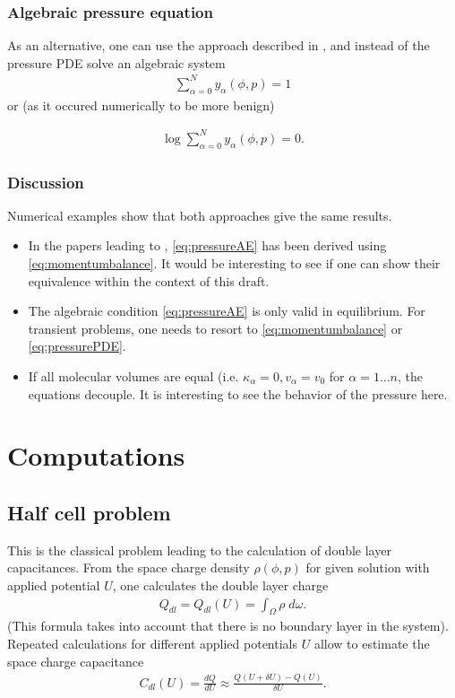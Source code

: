 \documentclass[12pt,oneside,reqno]{amsart}
\begin{document}
\subsubsection{Algebraic pressure equation}
As an alternative, one can use the approach described in \cite{MuellerFuhrmannLandstorfer2020},
and instead of the pressure PDE solve an algebraic system
\begin{align}
  \label{eq:pressureAE}
  \sum_{\alpha=0}^N y_\alpha(\phi,p)=1
\end{align}
or (as it occured numerically to be more benign)

\begin{align}
  \label{eq:pressureAElog}
  \log \sum_{\alpha=0}^N y_\alpha(\phi,p)=0.
\end{align}

\subsubsection{Discussion}
Numerical examples show that both approaches give the same results.
\begin{itemize}
  \item  In the papers leading to \cite{MuellerFuhrmannLandstorfer2020}, \eqref{eq:pressureAE} has
        been derived using \eqref{eq:momentumbalance}. It would be interesting to see if
        one can show their equivalence within the context of this draft. 
  \item The algebraic condition  \eqref{eq:pressureAE} is only valid in equilibrium. For transient
        problems, one needs to resort to \eqref{eq:momentumbalance} or \eqref{eq:pressurePDE}.
  \item If all molecular volumes are equal (i.e. $\kappa_\alpha=0, v_\alpha=v_0$ for $ \alpha=1\dots n$,
        the equations decouple. It is interesting to see the behavior of the pressure here.
\end{itemize}

\section{Computations}

\subsection{Half cell problem}
This is the classical problem leading to the calculation of double layer capacitances.
From the space charge density $\rho(\phi, p)$ for given solution with applied potential $U$,
one calculates the double layer charge
\begin{align}
  \label{eq:spacecharge}
  Q_{dl}=Q_{dl}(U)=\int_\Omega \rho\; d\omega.
\end{align}
(This formula takes into account that there is no boundary layer in the system). Repeated calculations
for different applied potentials $U$ allow to estimate the space charge capacitance
\begin{align}
  \label{eq:dlcap}
  C_{dl}(U) = \frac{dQ}{dU} \approx  \frac{Q(U+\delta U)-Q(U)}{\delta U}.
\end{align}
\end{document}
